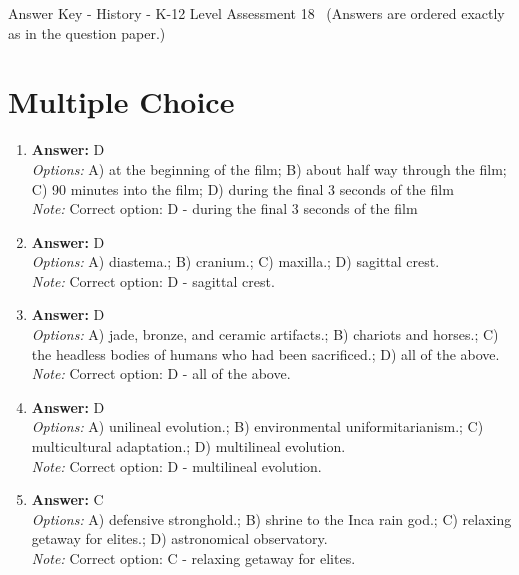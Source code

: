 \documentclass[12pt]{article}
\begin{document}
\begin{center}
Answer Key - History - K-12 Level Assessment 18 \
\small (Answers are ordered exactly as in the question paper.)
\end{center}

\section*{Multiple Choice}
\begin{enumerate}[label=\arabic*.]
\item \textbf{Answer:} D
\\ \textit{Options:} A) at the beginning of the film; B) about half way through the film; C) 90 minutes into the film; D) during the final 3 seconds of the film
\\ \textit{Note:} Correct option: D - during the final 3 seconds of the film
\item \textbf{Answer:} D
\\ \textit{Options:} A) diastema.; B) cranium.; C) maxilla.; D) sagittal crest.
\\ \textit{Note:} Correct option: D - sagittal crest.
\item \textbf{Answer:} D
\\ \textit{Options:} A) jade, bronze, and ceramic artifacts.; B) chariots and horses.; C) the headless bodies of humans who had been sacrificed.; D) all of the above.
\\ \textit{Note:} Correct option: D - all of the above.
\item \textbf{Answer:} D
\\ \textit{Options:} A) unilineal evolution.; B) environmental uniformitarianism.; C) multicultural adaptation.; D) multilineal evolution.
\\ \textit{Note:} Correct option: D - multilineal evolution.
\item \textbf{Answer:} C
\\ \textit{Options:} A) defensive stronghold.; B) shrine to the Inca rain god.; C) relaxing getaway for elites.; D) astronomical observatory.
\\ \textit{Note:} Correct option: C - relaxing getaway for elites.
\end{enumerate}
\end{document}
